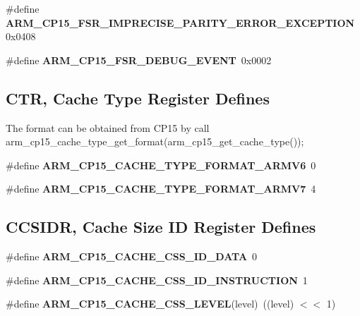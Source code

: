 \begin{DoxyCompactItemize}
\item 
\mbox{\label{group__RTEMSScoreCPUARMCP15_ga71fdca7f8f3c704507bccd6c5f075536}} 
\#define {\bfseries A\+R\+M\+\_\+\+C\+P15\+\_\+\+F\+S\+R\+\_\+\+I\+M\+P\+R\+E\+C\+I\+S\+E\+\_\+\+P\+A\+R\+I\+T\+Y\+\_\+\+E\+R\+R\+O\+R\+\_\+\+E\+X\+C\+E\+P\+T\+I\+ON}~0x0408
\item 
\mbox{\label{group__RTEMSScoreCPUARMCP15_ga9cb022e4f9c48bb200db9231846cccfe}} 
\#define {\bfseries A\+R\+M\+\_\+\+C\+P15\+\_\+\+F\+S\+R\+\_\+\+D\+E\+B\+U\+G\+\_\+\+E\+V\+E\+NT}~0x0002
\end{DoxyCompactItemize}
\subsection*{C\+TR, Cache Type Register Defines}
\label{_amgrpa24d76f08c2ce1c7f825e431c8436714}%
The format can be obtained from C\+P15 by call arm\+\_\+cp15\+\_\+cache\+\_\+type\+\_\+get\+\_\+format(arm\+\_\+cp15\+\_\+get\+\_\+cache\+\_\+type()); \begin{DoxyCompactItemize}
\item 
\mbox{\label{group__RTEMSScoreCPUARMCP15_gaf43d505dcb54b69e542dab26d29e8b91}} 
\#define {\bfseries A\+R\+M\+\_\+\+C\+P15\+\_\+\+C\+A\+C\+H\+E\+\_\+\+T\+Y\+P\+E\+\_\+\+F\+O\+R\+M\+A\+T\+\_\+\+A\+R\+M\+V6}~0
\item 
\mbox{\label{group__RTEMSScoreCPUARMCP15_ga1d15666198ee8930335d6bd5bf99664a}} 
\#define {\bfseries A\+R\+M\+\_\+\+C\+P15\+\_\+\+C\+A\+C\+H\+E\+\_\+\+T\+Y\+P\+E\+\_\+\+F\+O\+R\+M\+A\+T\+\_\+\+A\+R\+M\+V7}~4
\end{DoxyCompactItemize}
\subsection*{C\+C\+S\+I\+DR, Cache Size ID Register Defines}
\begin{DoxyCompactItemize}
\item 
\mbox{\label{group__RTEMSScoreCPUARMCP15_ga386af3724174a0eb2c44d3074a9b8999}} 
\#define {\bfseries A\+R\+M\+\_\+\+C\+P15\+\_\+\+C\+A\+C\+H\+E\+\_\+\+C\+S\+S\+\_\+\+I\+D\+\_\+\+D\+A\+TA}~0
\item 
\mbox{\label{group__RTEMSScoreCPUARMCP15_gafe5a9563dae943567f9a4ab892d1d232}} 
\#define {\bfseries A\+R\+M\+\_\+\+C\+P15\+\_\+\+C\+A\+C\+H\+E\+\_\+\+C\+S\+S\+\_\+\+I\+D\+\_\+\+I\+N\+S\+T\+R\+U\+C\+T\+I\+ON}~1
\item 
\mbox{\label{group__RTEMSScoreCPUARMCP15_gac811c1f1e5811fe182b9bd0d75d67db9}} 
\#define {\bfseries A\+R\+M\+\_\+\+C\+P15\+\_\+\+C\+A\+C\+H\+E\+\_\+\+C\+S\+S\+\_\+\+L\+E\+V\+EL}(level)~((level) $<$$<$ 1)
\end{DoxyCompactItemize}


